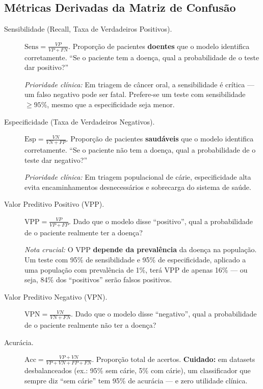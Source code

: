 \subsection{Métricas Derivadas da Matriz de Confusão}

\begin{description}
    \item[Sensibilidade (Recall, Taxa de Verdadeiros Positivos).] $\text{Sens} = \frac{VP}{VP + FN}$. Proporção de pacientes \textbf{doentes} que o modelo identifica corretamente. ``Se o paciente tem a doença, qual a probabilidade de o teste dar positivo?''
    
    \textit{Prioridade clínica:} Em triagem de câncer oral, a sensibilidade é crítica — um falso negativo pode ser fatal. Prefere-se um teste com sensibilidade $\geq 95\%$, mesmo que a especificidade seja menor.
    
    \item[Especificidade (Taxa de Verdadeiros Negativos).] $\text{Esp} = \frac{VN}{VN + FP}$. Proporção de pacientes \textbf{saudáveis} que o modelo identifica corretamente. ``Se o paciente não tem a doença, qual a probabilidade de o teste dar negativo?''
    
    \textit{Prioridade clínica:} Em triagem populacional de cárie, especificidade alta evita encaminhamentos desnecessários e sobrecarga do sistema de saúde.
    
    \item[Valor Preditivo Positivo (VPP).] $\text{VPP} = \frac{VP}{VP + FP}$. Dado que o modelo disse ``positivo'', qual a probabilidade de o paciente realmente ter a doença?
    
    \textit{Nota crucial:} O VPP \textbf{depende da prevalência} da doença na população. Um teste com 95\% de sensibilidade e 95\% de especificidade, aplicado a uma população com prevalência de 1\%, terá VPP de apenas 16\% — ou seja, 84\% dos ``positivos'' serão falsos positivos.
    
    \item[Valor Preditivo Negativo (VPN).] $\text{VPN} = \frac{VN}{VN + FN}$. Dado que o modelo disse ``negativo'', qual a probabilidade de o paciente realmente não ter a doença?
    
    \item[Acurácia.] $\text{Acc} = \frac{VP + VN}{VP + VN + FP + FN}$. Proporção total de acertos. \textbf{Cuidado:} em datasets desbalanceados (ex.: 95\% sem cárie, 5\% com cárie), um classificador que sempre diz ``sem cárie'' tem 95\% de acurácia — e zero utilidade clínica.
    

\end{description}
